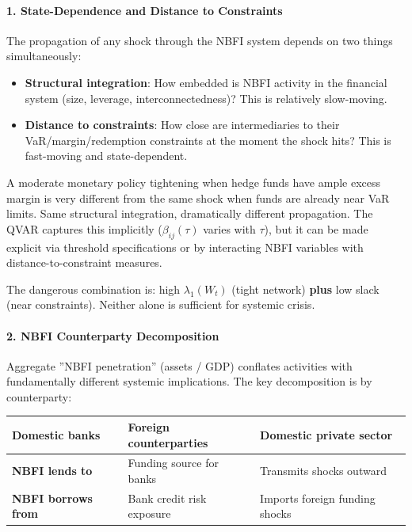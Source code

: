 \documentclass[11pt,a4paper]{article}
\begin{document}
\paragraph{1. State-Dependence and Distance to Constraints}

The propagation of any shock through the NBFI system depends on two things simultaneously:
\begin{itemize}
\item \textbf{Structural integration}: How embedded is NBFI activity in the financial system (size, leverage, interconnectedness)? This is relatively slow-moving.
\item \textbf{Distance to constraints}: How close are intermediaries to their VaR/margin/redemption constraints at the moment the shock hits? This is fast-moving and state-dependent.

\end{itemize}
A moderate monetary policy tightening when hedge funds have ample excess margin is very different from the same shock when funds are already near VaR limits. Same structural integration, dramatically different propagation. The QVAR captures this implicitly ($\beta_{ij}(\tau)$ varies with $\tau$), but it can be made explicit via threshold specifications or by interacting NBFI variables with distance-to-constraint measures.

The dangerous combination is: high $\lambda_1(W_t)$ (tight network) \textbf{plus} low slack (near constraints). Neither alone is sufficient for systemic crisis.


\paragraph{2. NBFI Counterparty Decomposition}

Aggregate ''NBFI penetration'' (assets / GDP) conflates activities with fundamentally different systemic implications. The key decomposition is by counterparty:


{\small
\begin{longtable}{|p{}|p{}|p{}|}
\hline
\textbf{Domestic banks} & \textbf{Foreign counterparties} & \textbf{Domestic private sector} \\
\hline
\endhead
\textbf{NBFI lends to} & Funding source for banks & Transmits shocks outward \\
\hline
\textbf{NBFI borrows from} & Bank credit risk exposure & Imports foreign funding shocks \\
\hline
\end{longtable}
}
\end{document}
